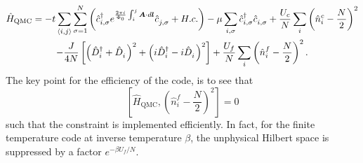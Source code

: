 \begin{multline}
	\hat{H}_\textrm{QMC}     =    - t  \sum_{\langle i,j \rangle}    \sum_{\sigma=1}^{N}  \left(  \hat{c}^{\dagger}_{i,\sigma}  e^{\frac{2\pi i}{\Phi_0}  \int_{i}^{j} \ve{A}\cdot d \ve{l}}\hat{c}^{\phantom\dagger}_{j,\sigma}   + H.c.  \right)  - \mu \sum_{i,\sigma} \hat{c}^{\dagger}_{i,\sigma}  \hat{c}^{\phantom\dagger}_{i,\sigma} 
	+    \frac{U_c}{N}  \sum_{i}   \left( \hat{n}^c_i -  \frac{N}{2} \right)^2  \\
    -    \frac{J}{4N}    \left[ \left(   \hat{D}^{\dagger}_{i}  + \hat{D}^{\phantom\dagger}_{i}    \right)^{2}  + 
                                                       \left(  i\hat{D}^{\dagger}_{i}  - i  \hat{D}^{\phantom\dagger}_{i}    \right)^2  \right]  
       +    \frac{U_f}{N}  \sum_{i}   \left( \hat{n}^f_i -  \frac{N}{2} \right)^2.
\label{Kondo_SUN_Ham_QMC.eq}
\end{multline}
The key point for the efficiency of the code, is to  see that 
\begin{equation}
	\left[   \hat{H}_\textrm{QMC},  \left( \hat{n}^f_i -  \frac{N}{2} \right)^2  \right]    = 0 
\label{Constraint_KLM.eq}
\end{equation}
such that the  constraint is implemented  efficiently.  In fact, for the finite temperature code  at inverse temperature $\beta$,  the unphysical Hilbert space   is suppressed by a  
factor  $e^{- \beta U_f/N} $. 



